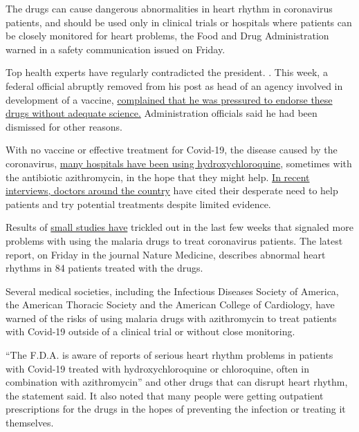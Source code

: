 The drugs can cause dangerous abnormalities in heart rhythm in
coronavirus patients, and should be used only in clinical trials or
hospitals where patients can be closely monitored for heart problems,
the Food and Drug Administration warned in a safety communication issued
on Friday.

Top health experts have regularly contradicted the president. . This
week, a federal official abruptly removed from his post as head of an
agency involved in development of a vaccine,
\href{https://www.nytimes3xbfgragh.onion/2020/04/23/us/politics/rick-bright-trump-hydroxychloroquine.html}{complained
that he was pressured to endorse these drugs without adequate science.}
Administration officials said he had been dismissed for other reasons.

With no vaccine or effective treatment for Covid-19, the disease caused
by the coronavirus,
\href{https://www.nytimes3xbfgragh.onion/2020/04/17/health/trump-hydroxychloroquine-coronavirus.html?searchResultPosition=2}{many
hospitals have been using hydroxychloroquine}, sometimes with the
antibiotic azithromycin, in the hope that they might help.
\href{https://www.nytimes3xbfgragh.onion/2020/04/17/health/trump-hydroxychloroquine-coronavirus.html}{In
recent interviews, doctors around the country} have cited their
desperate need to help patients and try potential treatments despite
limited evidence.

Results of
\href{https://www.nytimes3xbfgragh.onion/2020/04/12/health/chloroquine-coronavirus-trump.html?searchResultPosition=3}{small
studies have} trickled out in the last few weeks that signaled more
problems with using the malaria drugs to treat coronavirus patients. The
latest report, on Friday in the journal Nature Medicine, describes
abnormal heart rhythms in 84 patients treated with the drugs.

Several medical societies, including the Infectious Diseases Society of
America, the American Thoracic Society and the American College of
Cardiology, have warned of the risks of using malaria drugs with
azithromycin to treat patients with Covid-19 outside of a clinical trial
or without close monitoring.

``The F.D.A. is aware of reports of serious heart rhythm problems in
patients with Covid-19 treated with hydroxychloroquine or chloroquine,
often in combination with azithromycin'' and other drugs that can
disrupt heart rhythm, the statement said. It also noted that many people
were getting outpatient prescriptions for the drugs in the hopes of
preventing the infection or treating it themselves.

